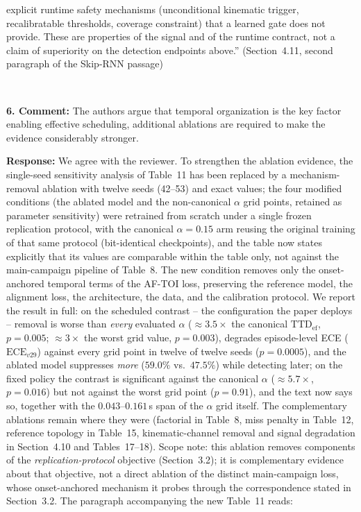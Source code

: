 \documentclass[1p,12pt,authoryear]{elsarticle}
\providecommand{\revcolor}{black}%
\begin{document}
explicit runtime safety mechanisms (unconditional kinematic trigger, recalibratable thresholds, coverage constraint) that a learned gate does not provide. These are properties of the signal and of the runtime contract, not a claim of superiority on the detection endpoints above.'' (Section~4.11, second paragraph of the Skip-RNN passage)

~

\noindent \textbf{6. Comment:} The authors argue that temporal organization is the key factor enabling effective scheduling, additional ablations are required to make the evidence considerably stronger.

\vspace{2mm}
\noindent \textbf{Response:} We agree with the reviewer. To strengthen the ablation evidence, the single-seed sensitivity analysis of Table~11 has been replaced by a mechanism-removal ablation with twelve seeds (42--53) and exact values; the four modified conditions (the ablated model and the non-canonical $\alpha$ grid points, retained as parameter sensitivity) were retrained from scratch under a single frozen replication protocol, with the canonical $\alpha{=}0.15$ arm reusing the original training of that same protocol (bit-identical checkpoints), and the table now states explicitly that its values are comparable within the table only, not against the main-campaign pipeline of Table~8. The new condition removes only the onset-anchored temporal terms of the AF-TOI loss, preserving the reference model, the alignment loss, the architecture, the data, and the calibration protocol. We report the result in full: on the scheduled contrast -- the configuration the paper deploys -- removal is worse than \emph{every} evaluated $\alpha$ (${\approx}3.5\times$ the canonical $\mathrm{TTD}_{\mathrm{ef}}$, $p=0.005$; ${\approx}3\times$ the worst grid value, $p=0.003$), degrades episode-level ECE ($\mathrm{ECE}_{v29}$) against every grid point in twelve of twelve seeds ($p=0.0005$), and the ablated model suppresses \emph{more} ($59.0\%$ vs.\ $47.5\%$) while detecting later; on the fixed policy the contrast is significant against the canonical $\alpha$ (${\approx}5.7\times$, $p=0.016$) but not against the worst grid point ($p=0.91$), and the text now says so, together with the $0.043$--$0.161$\,s span of the $\alpha$ grid itself. The complementary ablations remain where they were (factorial in Table~8, miss penalty in Table~12, reference topology in Table~15, kinematic-channel removal and signal degradation in Section~4.10 and Tables~17--18). {\color{\revcolor}Scope note: this ablation removes components of the \emph{replication-protocol} objective (Section~3.2); it is complementary evidence about that objective, not a direct ablation of the distinct main-campaign loss, whose onset-anchored mechanism it probes through the correspondence stated in Section~3.2.} The paragraph accompanying the new Table~11 reads:
\end{document}

